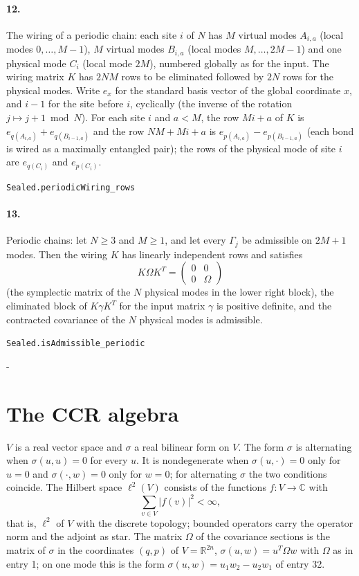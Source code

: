 \documentclass[11pt]{article}
\makeatletter
\newcommand{\keepspace}[1]{\par\penalty-100\begingroup\setlength{\dimen@}{#1}\dimen@ii\pagegoal\advance\dimen@ii-\pagetotal\ifdim\dimen@>\dimen@ii\ifdim\dimen@ii>\z@\vfil\fi\break\fi\endgroup}
\makeatother
\begin{document}
\paragraph{12.} The wiring of a periodic chain: each site $i$ of $N$ has $M$ virtual modes $A_{i,a}$ (local modes $0, \dots, M-1$), $M$ virtual modes $B_{i,a}$ (local modes $M, \dots, 2M-1$) and one physical mode $C_i$ (local mode $2M$), numbered globally as for the input. The wiring matrix $K$ has $2NM$ rows to be eliminated followed by $2N$ rows for the physical modes. Write $e_x$ for the standard basis vector of the global coordinate $x$, and $i - 1$ for the site before $i$, cyclically (the inverse of the rotation $j \mapsto j + 1 \bmod N$). For each site $i$ and $a < M$, the row $Mi + a$ of $K$ is $e_{q(A_{i,a})} + e_{q(B_{i-1,a})}$ and the row $NM + Mi + a$ is $e_{p(A_{i,a})} - e_{p(B_{i-1,a})}$ (each bond is wired as a maximally entangled pair); the rows of the physical mode of site $i$ are $e_{q(C_i)}$ and $e_{p(C_i)}$.\par{\footnotesize\texttt{Sealed.periodicWiring\_rows}}

\paragraph{13.} Periodic chains: let $N \ge 3$ and $M \ge 1$, and let every $\Gamma_j$ be admissible on $2M + 1$ modes. Then the wiring $K$ has linearly independent rows and satisfies \[K \Omega K^T = \begin{pmatrix} 0 & 0 \\ 0 & \Omega \end{pmatrix}\] (the symplectic matrix of the $N$ physical modes in the lower right block), the eliminated block of $K \gamma K^T$ for the input matrix $\gamma$ is positive definite, and the contracted covariance of the $N$ physical modes is admissible.\par{\footnotesize\texttt{Sealed.isAdmissible\_periodic}}

\keepspace{14\baselineskip}\section*{The CCR algebra}
$V$ is a real vector space and $\sigma$ a real bilinear form on $V$. The form $\sigma$ is alternating when $\sigma(u, u) = 0$ for every $u$. It is nondegenerate when $\sigma(u, \cdot) = 0$ only for $u = 0$ and $\sigma(\cdot, w) = 0$ only for $w = 0$; for alternating $\sigma$ the two conditions coincide. The Hilbert space $\ell^2(V)$ consists of the functions $f : V \to \mathbb C$ with \[\sum_{v \in V} |f(v)|^2 < \infty,\] that is, $\ell^2$ of $V$ with the discrete topology; bounded operators carry the operator norm and the adjoint as star. The matrix $\Omega$ of the covariance sections is the matrix of $\sigma$ in the coordinates $(q, p)$ of $V = \mathbb R^{2n}$, $\sigma(u, w) = u^T \Omega w$ with $\Omega$ as in entry 1; on one mode this is the form $\sigma(u, w) = u_1 w_2 - u_2 w_1$ of entry 32.
\end{document}
